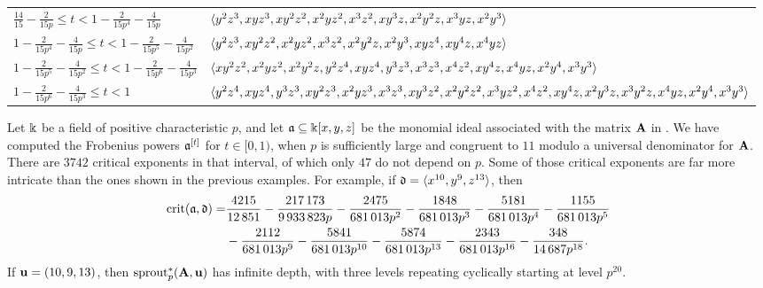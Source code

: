 \documentclass{amsart}
\begin{document}
\begin{example}
{\begin{landscape}
\begin{tabular}{ll}
        $\frac{14}{15}-\frac{2}{15 p}\leq t<1-\frac{2}{15p^4}-\frac{4}{15 p}$
        & $\langle y^2 z^3,x y z^3,x y^2 z^2,x^2 y z^2,x^3 z^2,x y^3 z,x^2 y^2 z,x^3 y z,x^2 y^3 \rangle$ \\
        $1-\frac{2}{15 p^4}-\frac{4}{15p}\leq t<1-\frac{2}{15 p^5}-\frac{4}{15 p^2}$
        & $\langle y^2 z^3,x y^2 z^2,x^2 y z^2,x^3 z^2,x^2 y^2 z,x^2 y^3,x y z^4,x y^4 z,x^4 y z \rangle$ \\
        $1-\frac{2}{15p^5}-\frac{4}{15 p^2}\leq t<1-\frac{2}{15 p^6}-\frac{4}{15 p^3}$
        & $\langle x y^2 z^2,x^2 y z^2,x^2 y^2 z,y^2 z^4,x y z^4,y^3 z^3,x^3 z^3,x^4 z^2,x y^4z,x^4 y z,x^2 y^4,x^3 y^3 \rangle$ \\
        $1-\frac{2}{15 p^6}-\frac{4}{15 p^3}\leq t<1$
        & $\langle y^2 z^4,x y z^4,y^3 z^3,x y^2 z^3,x^2 y z^3,x^3z^3,x y^3 z^2,x^2 y^2 z^2,x^3 y z^2,x^4 z^2,x y^4 z,x^2 y^3 z,x^3 y^2 z,x^4 y z,x^2 y^4,x^3 y^3 \rangle$ \\
        \bottomrule
      \end{tabular}
      \label{table: new homogeneous example}
    \end{landscape}
    \clearpage%
}
\end{example}

\begin{example}
   \label{ex: new homogeneous example}
   Let $\Bbbk$ be a field of positive characteristic $p$, and let $\mathfrak{a} \subseteq \Bbbk[x,y,z]$ be the monomial ideal associated with the matrix $\mathbf{A}$ in .
   We have computed the Frobenius powers $\mathfrak{a}^{[t]}$ for $t \in [0,1)$, when $p$ is sufficiently large and congruent to $11$ modulo a universal denominator for $\mathbf{A}$.
   There are $\num{3742}$ critical exponents in that interval, of which only $47$ do not depend on $p$.
   Some of those critical exponents are far more intricate than the ones shown in the previous examples.
   For example, if $\mathfrak{d} = \langle x^{10},y^9,z^{13} \rangle$, then
   \begin{align*}
     \operatorname{crit}(\mathfrak{a},\mathfrak{d}) = &\frac{\num{4215}}{\num{12851}}-\frac{\num{217173}}{\num{9933823}p} -\frac{\num{2475}}{\num{681013}p^2}-\frac{\num{1848}}{\num{681013}p^3}-\frac{\num{5181}}{\num{681013}p^4}-\frac{\num{1155}}{\num{681013}p^5}\\
                                                              &-\frac{\num{2112}}{\num{681013}p^9}
      -\frac{\num{5841}}{\num{681013}p^{10}}-\frac{\num{5874}}{\num{681013}p^{13}}-\frac{\num{2343}}{\num{681013}p^{16}}-\frac{\num{348}}{\num{14687}p^{18}}.
   \end{align*}
   If $\mathbf{u} = (10,9,13)$, then $\operatorname{sprout}_p^*(\mathbf{A},\mathbf{u})$ has infinite depth, with three levels repeating cyclically starting at level $p^{20}$.
\end{example}
\end{document}
